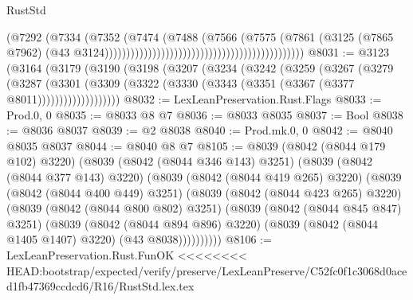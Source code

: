 \begin{lexlean}{RustStd}
\begin{coremodule}
{\begin{coremodule}
{{{{{{{{{{{{{{{{{{{{{{{{{{{{{{{{{{{{{{{{{{{{{                                                                            (@7292
                                                                              (@7334
                                                                                (@7352
                                                                                  (@7474
                                                                                    (@7488
                                                                                      (@7566
                                                                                        (@7575
                                                                                          (@7861
                                                                                            (@3125
                                                                                              (@7865
                                                                                                @7962)
                                                                                              (@43
                                                                                                @3124))))))))))))))))))))))))))))))))))))))))))))))
@8031 := @3123
    (@3164
      (@3179
        (@3190
          (@3198
            (@3207
              (@3234
                (@3242
                  (@3259
                    (@3267
                      (@3279
                        (@3287
                          (@3301
                            (@3309
                              (@3322 (@3330 (@3343 (@3351 (@3367 (@3377 @8011)))))))))))))))))))
@8032 := LexLeanPreservation.Rust.Flags
@8033 := Prod.{0, 0}
@8035 := @8033 @8 @7
@8036 := @8033 @8035
@8037 := Bool
@8038 := @8036 @8037
@8039 := @2 @8038
@8040 := Prod.mk.{0, 0}
@8042 := @8040 @8035 @8037
@8044 := @8040 @8 @7
@8105 := @8039
    (@8042 (@8044 @179 @102) @3220)
    (@8039
      (@8042 (@8044 @346 @143) @3251)
      (@8039
        (@8042 (@8044 @377 @143) @3220)
        (@8039
          (@8042 (@8044 @419 @265) @3220)
          (@8039
            (@8042 (@8044 @400 @449) @3251)
            (@8039
              (@8042 (@8044 @423 @265) @3220)
              (@8039
                (@8042 (@8044 @800 @802) @3251)
                (@8039
                  (@8042 (@8044 @845 @847) @3251)
                  (@8039
                    (@8042 (@8044 @894 @896) @3220)
                    (@8039 (@8042 (@8044 @1405 @1407) @3220) (@43 @8038))))))))))
@8106 := LexLeanPreservation.Rust.FunOK
<<<<<<<< HEAD:bootstrap/expected/verify/preserve/LexLeanPreserve/C52fc0f1c3068d0aced1fb47369ccdcd6/R16/RustStd.lex.tex
}}}}}}}}}}}}}}}}}}}}}}}}}}}}}}}}}}}}}}}}}}}}}
\end{coremodule}}
\end{coremodule}
\end{lexlean}
